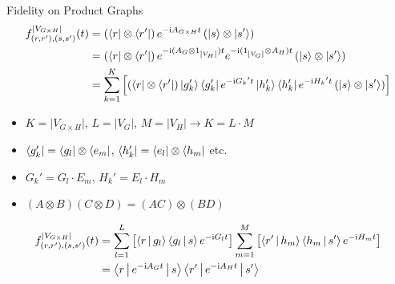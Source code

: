 \documentclass{beamer}
\begin{document}
\begin{frame}{Fidelity on Product Graphs}
	\begin{align*}
		f^{\left|V_{G\times H}\right|}_{(r,r'),(s,s')}(t) &= \left( \bra{r} \otimes \bra{r'} \right)e^{-\text{i}A_{G\times H}t} \left( \ket{s} \otimes \ket{s'} \right) \\
		&= \left( \bra{r} \otimes \bra{r'} \right)e^{-\text{i}(A_G \otimes \text{1}_{\left|V_H\right|})t} e^{-\text{i}(\text{1}_{\left|V_G\right|} \otimes A_H)t} \left( \ket{s} \otimes \ket{s'} \right) \\
		&= \sum_{k=1}^{K}\left[ \left( \bra{r} \otimes \bra{r'} \right) \ket{g'_k}\bra{g'_k}e^{-\text{i}G_k{}'t} \ket{h_k'}\bra{h_k'}e^{-\text{i}H_k{}'t} \left( \ket{s} \otimes \ket{s'} \right) \right]
	\end{align*}
	\begin{itemize}
		\item $K = \left|V_{G\times H}\right|$, $L = \left|V_G\right|$, $M = \left|V_H\right| \rightarrow K = L\cdot M$
		\item $\bra{g'_k} = \bra{g_l} \otimes \bra{e_m}$, $\bra{h'_k} = \bra{e_l} \otimes \bra{h_m}$ etc.
		\item $G_k{}' = G_l\cdot E_m$, $H_k{}' = E_l\cdot H_m$
		\item $(A\otimes B)(C\otimes D) = (AC)\otimes (BD)$
	\end{itemize}
	\begin{align*}
		f^{\left|V_{G\times H}\right|}_{(r,r'),(s,s')}(t) &= \sum_{l=1}^L\left[ \Braket{r|g_l}\Braket{g_l|s}e^{-\text{i}G_l t} \right] \sum_{m=1}^M\left[ \Braket{r'|h_m}\Braket{h_m|s'}e^{-\text{i}H_mt} \right] \\
		&= \Braket{r|e^{-\text{i}A_G t}|s}\Braket{r'|e^{-\text{i}A_H t}|s'}
	\end{align*}
\end{frame}
\end{document}
